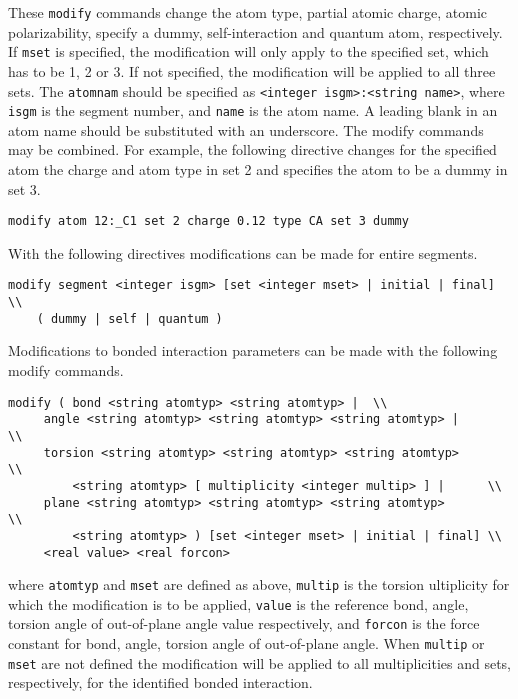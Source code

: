 These \verb+modify+ commands change the atom type, partial atomic charge,
atomic polarizability, specify a dummy, self-interaction and quantum atom,
respectively. If \verb+mset+ is specified, the modification will only
apply to the specified set, which has to be 1, 2 or 3. If not specified,
the modification will be applied to all three sets. The \verb+atomnam+
should be specified as \verb+<integer isgm>:<string name>+, where
\verb+isgm+ is the segment number, and \verb+name+ is the atom name. A
leading blank in an atom name should be substituted with an underscore.
The modify commands may be combined. For example, the following directive
changes for the specified atom the charge and atom type in set 2 and 
specifies the atom to be a dummy in set 3.

\begin{verbatim}
modify atom 12:_C1 set 2 charge 0.12 type CA set 3 dummy
\end{verbatim}

With the following directives modifications can be made for entire
segments.

\begin{verbatim}
modify segment <integer isgm> [set <integer mset> | initial | final] \\
	( dummy | self | quantum )
\end{verbatim}

Modifications to bonded interaction parameters can be made with the
following modify commands.

\begin{verbatim}
modify ( bond <string atomtyp> <string atomtyp> |  \\
	 angle <string atomtyp> <string atomtyp> <string atomtyp> |        \\ 
 	 torsion <string atomtyp> <string atomtyp> <string atomtyp>        \\
		 <string atomtyp> [ multiplicity <integer multip> ] |      \\
	 plane <string atomtyp> <string atomtyp> <string atomtyp>          \\
		 <string atomtyp> ) [set <integer mset> | initial | final] \\
	 <real value> <real forcon>
\end{verbatim}

where \verb+atomtyp+ and \verb+mset+ are defined as above, \verb+multip+
is the torsion ultiplicity for which the modification is to be applied,
\verb+value+ is the reference bond, angle, torsion angle of out-of-plane
angle value respectively, and \verb+forcon+ is the force constant for
bond, angle, torsion angle of out-of-plane angle. When \verb+multip+
or \verb+mset+ are not defined the modification will be applied to
all multiplicities and sets, respectively, for the identified bonded
interaction.

